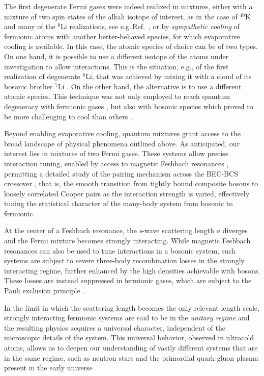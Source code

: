 The first degenerate Fermi gases were indeed realized in mixtures, either with a mixture of two spin states of the alkali isotope of interest, as in the case of $^{40}$K \cite{DeMarco1999oof} and many of the $^6$Li realizations, see e.g.\,Ref.~\cite{Granade2002aop}, or by \textit{sympathetic cooling} of fermionic atoms with another better-behaved species, for which evaporative cooling is available. In this case, the atomic species of choice can be of two types. On one hand, it is possible to use a different isotope of the atoms under investigation to allow interactions. This is the situation, e.g., of the first realization of degenerate $^6$Li, that was achieved by mixing it with a cloud of its bosonic brother $^7$Li \cite{Truscott2001oof, Schreck2001qbe}. On the other hand, the alternative is to use a different atomic species. This technique was not only employed to reach quantum degeneracy with fermionic gases \cite{Hadzibabic2002tsm}, but also with bosonic species which proved to be more challenging to cool than others \cite{Modugno2001bec}. 

Beyond enabling evaporative cooling, quantum mixtures grant access to the broad landscape of physical phenomena outlined above. As anticipated, our interest lies in mixtures of two Fermi gases. These systems allow  precise interaction tuning, enabled by access to magnetic Feshbach resonances \cite{Chin2010fri}, permitting a detailed study of the pairing mechanism across the \ac{BEC}-\ac{BCS} crossover \cite{Parish2014tbb}, that is, the smooth transition from tightly bound composite bosons to loosely correlated Cooper pairs as the interaction strength is varied, effectively tuning the statistical character of the many-body system from bosonic to fermionic.
 
At the center of a Feshbach resonance, the \textit{s}-wave scattering length $a$ diverges and the Fermi mixture becomes strongly interacting. While magnetic Feshbach resonances can also be used to tune interactions in a bosonic system, such systems are subject to severe three-body recombination losses in the strongly interacting regime, further enhanced by the high densities achievable with bosons. These losses are instead suppressed in fermionic gases, which are subject to the Pauli exclusion principle \cite{Petrov2004wbd}.

In the limit in which the scattering length becomes the only relevant length scale, strongly interacting fermionic systems are said to be in the \textit{unitary regime} and the resulting physics acquires a universal character, independent of the microscopic details of the system. This universal behavior, observed in ultracold atoms, allows us to deepen our understanding of vastly different systems that are in the same regime, such as neutron stars and the primordial quark-gluon plasma present in the early universe \cite{Giorgini2008tou, Schaefer2009npf,Sedrakian1997sia, Strinati2018tbb}.

